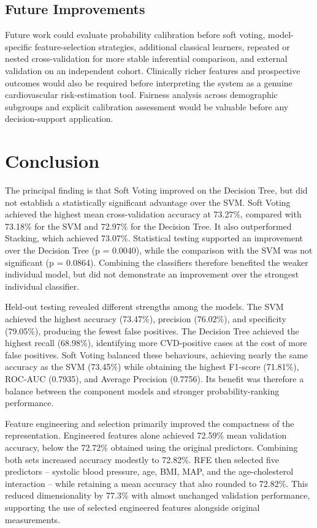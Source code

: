 \documentclass[11pt,a4paper]{article}
\begin{document}
\subsection{Future Improvements}

Future work could evaluate probability calibration before soft voting, model-specific feature-selection strategies, additional classical learners, repeated or nested cross-validation for more stable inferential comparison, and external validation on an independent cohort. Clinically richer features and prospective outcomes would also be required before interpreting the system as a genuine cardiovascular risk-estimation tool. Fairness analysis across demographic subgroups and explicit calibration assessment would be valuable before any decision-support application.

\section{Conclusion}

The principal finding is that Soft Voting improved on the Decision Tree, but did not establish a statistically significant advantage over the SVM. Soft Voting achieved the highest mean cross-validation accuracy at 73.27\%, compared with 73.18\% for the SVM and 72.97\% for the Decision Tree. It also outperformed Stacking, which achieved 73.07\%. Statistical testing supported an improvement over the Decision Tree (p = 0.0040), while the comparison with the SVM was not significant (p = 0.0864). Combining the classifiers therefore benefited the weaker individual model, but did not demonstrate an improvement over the strongest individual classifier.

Held-out testing revealed different strengths among the models. The SVM achieved the highest accuracy (73.47\%), precision (76.02\%), and specificity (79.05\%), producing the fewest false positives. The Decision Tree achieved the highest recall (68.98\%), identifying more CVD-positive cases at the cost of more false positives. Soft Voting balanced these behaviours, achieving nearly the same accuracy as the SVM (73.45\%) while obtaining the highest F1-score (71.81\%), ROC-AUC (0.7935), and Average Precision (0.7756). Its benefit was therefore a balance between the component models and stronger probability-ranking performance.

Feature engineering and selection primarily improved the compactness of the representation. Engineered features alone achieved 72.59\% mean validation accuracy, below the 72.72\% obtained using the original predictors. Combining both sets increased accuracy modestly to 72.82\%. RFE then selected five predictors -- systolic blood pressure, age, BMI, MAP, and the age-cholesterol interaction -- while retaining a mean accuracy that also rounded to 72.82\%. This reduced dimensionality by 77.3\% with almost unchanged validation performance, supporting the use of selected engineered features alongside original measurements.
\end{document}
